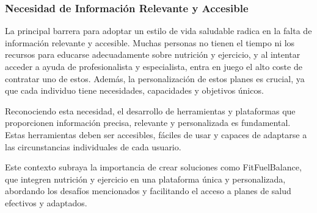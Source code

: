 \subsubsection{Necesidad de Información Relevante y Accesible}
La principal barrera para adoptar un estilo de vida saludable radica en la falta de información relevante y accesible. Muchas personas no tienen el tiempo ni los recursos para educarse adecuadamente sobre nutrición y ejercicio, y al intentar acceder a ayuda de profesionalista y especialista, entra en juego el alto coste de contratar uno de estos. Además, la personalización de estos planes es crucial, ya que cada individuo tiene necesidades, capacidades y objetivos únicos.

Reconociendo esta necesidad, el desarrollo de herramientas y plataformas que proporcionen información precisa, relevante y personalizada es fundamental. Estas herramientas deben ser accesibles, fáciles de usar y capaces de adaptarse a las circunstancias individuales de cada usuario.

Este contexto subraya la importancia de crear soluciones como FitFuelBalance, que integren nutrición y ejercicio en una plataforma única y personalizada, abordando los desafíos mencionados y facilitando el acceso a planes de salud efectivos y adaptados.
